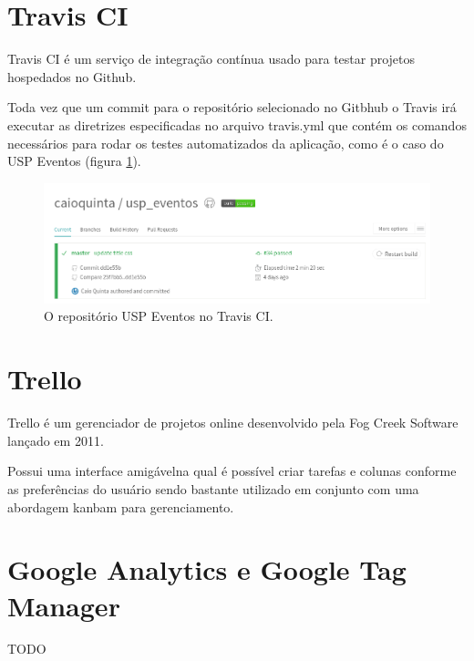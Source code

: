 \section{Travis CI}
\par Travis CI é um serviço de integração contínua usado para testar projetos hospedados no Github.
\par Toda vez que um commit para o repositório selecionado no Gitbhub o Travis irá executar as diretrizes especificadas no arquivo travis.yml que contém os comandos necessários para rodar os testes automatizados da aplicação, como é o caso do USP Eventos (figura \ref{fig:travis}).
\begin{figure}[htb]
\centering
\includegraphics[width=15cm]{figuras/travis}
\caption{\label{fig:travis} O repositório USP Eventos no Travis CI.}
\end{figure}

\section{Trello}
\par Trello é um gerenciador de projetos online desenvolvido pela Fog Creek Software lançado em 2011.
\par Possui uma interface amigávelna qual é possível criar tarefas e colunas conforme as preferências do usuário sendo bastante utilizado em conjunto com uma abordagem kanbam para gerenciamento.

\section{Google Analytics e Google Tag Manager}
TODO
